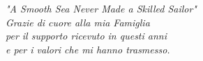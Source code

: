 \frontmatter
{}

\begin{flushright}

\null{}
\large{\textit{"A Smooth Sea Never Made a Skilled Sailor"\\\vspace{2em}Grazie di cuore alla mia Famiglia\\per il supporto ricevuto in questi anni\\e per i valori che mi hanno trasmesso.}}\par
\null{}

\end{flushright}